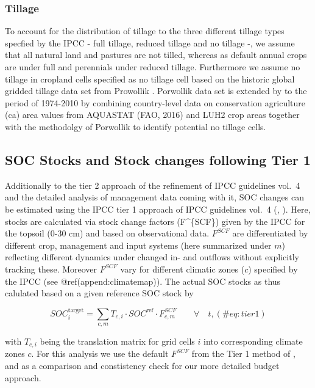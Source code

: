 \documentclass[gc, manuscript]{copernicus}
\begin{document}
\hypertarget{sec:tillage}{%
\subsubsection{Tillage}\label{sec:tillage}}

To account for the distribution of tillage to the three different
tillage types specfied by the IPCC - full tillage, reduced tillage and
no tillage -, we assume that all natural land and pastures are not
tilled, whereas as default annual crops are under full and perennials
under reduced tillage. Furthermore we assume no tillage in cropland
cells specified as no tillage cell based on the historic global gridded
tillage data set from Prowollik \citep{porwollik_generating_2018}.
Porwollik data set is extended by to the period of 1974-2010 by
combining country-level data on conservation agriculture (ca) area
values from AQUASTAT (FAO, 2016) and LUH2 crop areas together with the
methodolgy of Porwollik to identify potential no tillage cells.

\newpage

\hypertarget{sec:tier1}{%
\subsection{SOC Stocks and Stock changes following Tier
1}\label{sec:tier1}}

Additionally to the tier 2 approach of the refinement of IPCC guidelines
vol.~4 \citep{ipcc_2019_2019} and the detailed analysis of management
data coming with it, SOC changes can be estimated using the IPCC tier 1
approach of IPCC guidelines vol.~4 (\citet{ipcc_2006_2006},
\citet{ipcc_2019_2019}). Here, stocks are calculated via stock change
factors (F\^{}\{SCF\}) given by the IPCC for the topsoil (0-30 cm) and
based on observational data. \(F^{SCF}\) are differentiated by different
crop, management and input systems (here summarized under \(m\))
reflecting different dynamics under changed in- and outflows without
explicitly tracking these. Moreover \(F^{SCF}\) vary for different
climatic zones (\(c\)) specified by the IPCC (see
@ref(append:climatemap)). The actual SOC stocks as thus calulated based
on a given reference SOC stock by

\begin{equation}
SOC^{\text{target}}_{i} = \sum_{c,m} T_{c,i} \cdot SOC^{\text{ref}} \cdot F^{SCF}_{c,m} \qquad\forall\quad t,
(\#eq:tier1)
\end{equation}

with \(T_{c,i}\) being the translation matrix for grid cells \(i\) into
corresponding climate zones \(c\). For this analysis we use the default
\(F^{SCF}\) from the Tier 1 method of \citep{ipcc_2006_2006}, and
\citep{ipcc_2019_2019} as a comparison and constistency check for our
more detailed budget approach. \newpage
\end{document}
